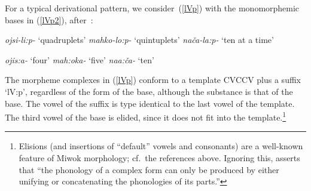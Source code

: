\documentclass[output=paper]{langsci/langscibook}
\begin{document}
For a typical derivational pattern, we consider~(\ref{lVp}) with the
monomorphemic bases in (\ref{lVp2}),
after~\cite[376\hspace{1pt}f.\@]{smit:85}:
\begin{exe}
\ex
\label{lVp}
\begin{xlist}
\ex
\emph{ojsi-li:p-} `quadruplets' 
%
\ex
\emph{mahko-lo:p-} `quintuplets'  
%
\ex
\emph{na\v{c}a-la:p-} `ten at a time' 
\end{xlist}
\end{exe}
% 
\begin{exe}
\ex
\label{lVp2}
\begin{xlist}
\ex
\emph{ojis:a-} `four'
\ex \emph{mah:oka-} `five'
\ex \emph{naa:\v{c}a-} `ten'
\end{xlist}
\end{exe}
% 
The morpheme complexes in (\ref{lVp}) conform to a template {\small CVCCV}
plus a suffix `l{\small V:}p', regardless of the form of the base, although
the  substance is that of the base.  The vowel of the suffix is
type identical to the last vowel of the template. The third vowel of the
base is elided, since it does not fit into the template.\footnote{%
  Elisions (and insertions of ``default'' vowels and consonants) are a well-known
  feature of Mi\-wok morphology; cf.\ the references above. Ignoring this,
  \cite[468]{bir:kle:94} 
  asserts that
  ``the phonology of a complex form can only be produced by either unifying
  or concatenating the phonologies of its parts.''%
}
\end{document}
